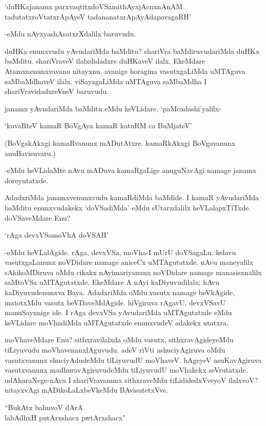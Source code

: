 \begin{shloka}
`duHKajanamx parxvaqtitxdoVSamithAyxjAcnxnAnAM\\
tadutatxroVtatxrApAyeV tadananatxrApAyAdapavagaRH'
\end{shloka}

-eMdu nAyxyashAsatxrXdalilx baruvudu.

duHKa enunxvudu yAvudariMda baMditu? shariVra baMdiruvudariMda duHKa baMditu. shariVraveV ilalxdidadxre duHKaveV ilalx. EkeMdare Atamxnenunxvavanu nitayxnu. avanige horagina vasutxgaLiMda uMTAguva saMbaMdhaveV ilalx. viSayagaLiMda uMTAguva saMbaMdha I shariVravidadxreVneV baruvudu.

janamx yAvudariMda baMditu eMdu keVLidare, `paMcadashi'yalilx-

\begin{shloka}
`kuvaRteV kamaR BoVgAya kamaR katuRM ca BuMjateV'
\end{shloka}

(BoVgakAkxgi kamaRvanunx mADutAtxre. kamaRkAkxgi BoVgavanunx anuBavisuvaru.)

-eMdu heVLidaMte nAvu mADuva kamaRgaLige anuguNavAgi namage janamx doreyutatxde.

AdadxriMda janamxvenunxvudu kamaRdiMda baMdide. I kamaR yAvudariMda baMditu enunxvudakekx `doVSadiMda' eMdu sUtarxdalilx heVLalapxTiTxde. doVSaveMdare Enu?

\begin{shloka}
`rAga devxVSamoVhA doVSAH'
\end{shloka}

-eMdu heVLalAgide. rAga, devxVSa, moVha-I mUrU doVSagaLu. kelavu vasutxgaLanunx noVDidare namage aniceCx uMTAgutatxde. nAvu maneyalilx sAkikoMDiruva oMdu cikakx nAyimariyanunx noVDidare namage manasisxnalilx saMtoVSa uMTAgutatxde. EkeMdare A nAyi kaDiyuvudilalx; hAvu kaDiyuvudenunxva Baya. AdadxriMda oMdu vasutx namage beVkAgide, matotxMdu vasutx beVDaveMdAgide. hiVgiruva rAgavU, devxVSavU manuSayxnige ide. I rAga devxVSa yAvudariMda uMTAgutatxde eMdu keVLidare moVhadiMda uMTAgutatxde enunxvudeV adakekx utatxra.

moVhaveMdare Enu? sithxravilalxda oMdu vasutx, sithxravAgideyeMdu tiLiyuvudu moVhavenanxlAguvudu. adeV riVti ashuciyAgiruva oMdu vasutxvanunx shuciyAdudeMdu tiLiyuvudU moVhaveV. hAgeyeV asuKavAgiruva vasutxvanunx madhuravAgiruvudeMdu tiLiyuvudU moVhakekx seVrutatxde. udAharaNege-nAvu I shariVravanunx sithxraveMdu tiLididedxVveyoV ilalxvoV? nitayxvAgi mADikoLaLxbeVkeMdu BAvisutetxVve.

\begin{shloka}
``BukAtx bahuvoV dArA\\
labAdhxH putArxshacx pwtArxshacx"
\end{shloka}

